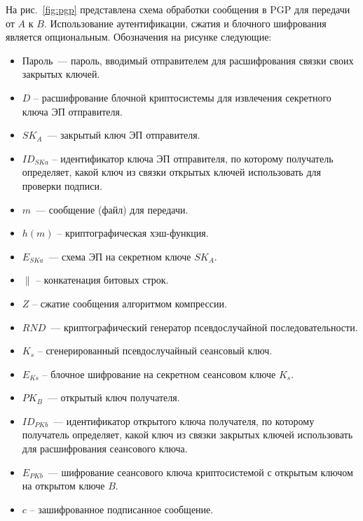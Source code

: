 На рис.~\ref{fig:pgp} представлена схема обработки сообщения в PGP для передачи от $A$ к $B$. Использование аутентификации, сжатия и блочного шифрования является опциональным. Обозначения на рисунке следующие:
\begin{itemize}
    \item Пароль~--- пароль, вводимый отправителем для расшифрования связки своих закрытых ключей.
    \item $D$ -- расшифрование блочной криптосистемы для извлечения секретного ключа ЭП отправителя.
    \item $SK_A$~--- закрытый ключ ЭП отправителя.
    \item $ID_{SKa}$ -- идентификатор ключа ЭП отправителя, по которому получатель определяет, какой ключ из связки открытых ключей использовать для проверки подписи.
    \item $m$~--- сообщение (файл) для передачи.
    \item $h(m)$ -- криптографическая хэш-функция.
    \item $E_{SKa}$~--- схема ЭП на секретном ключе $SK_A$.
    \item $\|$ -- конкатенация битовых строк.
    \item $Z$ -- сжатие сообщения алгоритмом компрессии.
    \item $RND$~--- криптографический генератор псевдослучайной последовательности.
    \item $K_s$ -- сгенерированный псевдослучайный сеансовый ключ.
    \item $E_{Ks}$ -- блочное шифрование на секретном сеансовом ключе $K_s$.
    \item $PK_B$~--- открытый ключ получателя.
    \item $ID_{PKb}$~--- идентификатор открытого ключа получателя, по которому получатель определяет, какой ключ из связки закрытых ключей использовать для расшифрования сеансового ключа.
    \item $E_{PKb}$~--- шифрование сеансового ключа криптосистемой с открытым ключом на открытом ключе $B$.
    \item $c$ -- зашифрованное подписанное сообщение.
\end{itemize}
